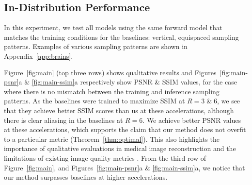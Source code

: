 \subsection{In-Distribution Performance}
In this experiment, we test all models using the same forward model that matches the training conditions for the baselines: vertical, equispaced sampling patterns. Examples of various sampling patterns are shown in Appendix~\ref{app:brains}.

Figure~\ref{fig:main} (top three rows) shows qualitative results and Figures~\ref{fig:main-psnr}a \& \ref{fig:main-ssim}a respectively show PSNR \& SSIM values, for the case where there is no mismatch between the training and inference sampling patterns.
As the baselines were trained to maximize SSIM at $R=3\;\&\;6$, we see that they achieve better SSIM scores than us at these accelerations, although there is clear aliasing in the baselines at $R=6$. We achieve better PSNR values at these accelerations, which supports the claim that our method does not overfit to a particular metric (Theorem~\ref{thm:optimal}).
This also highlights the importance of qualitative evaluations in medical image reconstruction and the limitations of existing image quality metrics \cite{mason2019comparison}.
From the third row of Figure~\ref{fig:main}, and Figures~\ref{fig:main-psnr}a \& \ref{fig:main-ssim}a, we notice that our method surpasses baselines at higher accelerations. 

